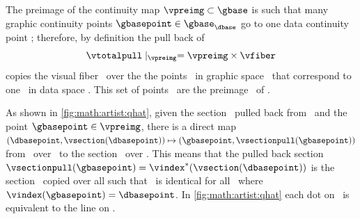\documentclass[../main.tex]{subfiles}
\begin{document}
The preimage of the continuity map $\vpreimg \subset \gbase$ is such that many graphic continuity points $\gbasepoint \in \gbase_{\dbase}$ go to one data continuity point \dbasepoint; therefore, by definition the pull back of \vsection\
\begin{equation}
    \vtotalpull \mid_{\vpreimg} = \vpreimg \times \vfiber
\end{equation}
copies the visual fiber \vfiber\ over the the points \gbasepoint\ in graphic space \gbase\ that correspond to one \dbasepoint\ in data space \dbase. This set of points \gbasepoint\ are the preimage \vpreimg\ of \dbasepoint. 

As shown in \autoref{fig:math:artist:qhat}, given the section \vsectionpull\ pulled back from \vsection\ and the point $\gbasepoint \in \vpreimg$, there is a direct map $(\dbasepoint, \vsection(\dbasepoint)) \mapsto (\gbasepoint, \vsectionpull(\gbasepoint))$  from \vsection\ over \dbasepoint\ to the section \vsectionpull\ over \gbasepoint. This means that the pulled back section $\vsectionpull(\gbasepoint) = \vindex^*(\vsection(\dbasepoint))$ is the section \vsection\ copied over all \gbasepoint such that \vsectionpull\ is identical for all \gbasepoint\ where $\vindex(\gbasepoint) = \dbasepoint$. In \autoref{fig:math:artist:qhat} each dot on \vfiber\ is equivalent to the line on \vfiberpull. 
\end{document}
